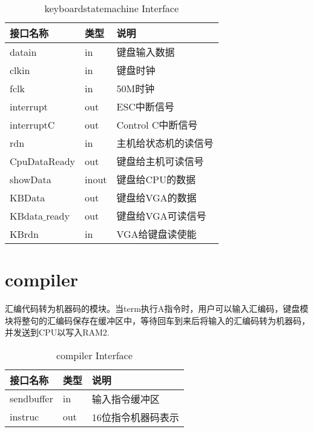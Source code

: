 \begin{table}[H]
\begin{center}
\renewcommand{\arraystretch}{1.3}
\small
\caption{keyboardstatemachine Interface}
\label{tab:treatments}
\begin{tabular}{|p{3cm}<{\centering}|p{1.4cm}<{\centering}|p{7cm}<{\centering}|}
\hline
接口名称 & 类型 & 说明 \\
\hline
datain & in & 键盘输入数据 \\
\hline
clkin & in & 键盘时钟 \\
\hline
fclk & in & 50M时钟 \\
\hline
interrupt & out & ESC中断信号 \\
\hline
interruptC & out & Control C中断信号 \\
\hline
rdn & in & 主机给状态机的读信号 \\
\hline
CpuDataReady & out & 键盘给主机可读信号 \\
\hline
showData & inout & 键盘给CPU的数据 \\
\hline
KBData & out & 键盘给VGA的数据\\
\hline
KBdata$\_$ready & out & 键盘给VGA可读信号\\
\hline
KBrdn & in & VGA给键盘读使能 \\
\hline
\end{tabular}
\end{center}
\end{table}


\section{compiler}

汇编代码转为机器码的模块。当term执行A指令时，用户可以输入汇编码，键盘模块将整句的汇编码保存在缓冲区中，等待回车到来后将输入的汇编码转为机器码，并发送到CPU以写入RAM2.

\begin{table}[H]
\begin{center}
\renewcommand{\arraystretch}{1.3}
\small
\caption{compiler Interface}
\label{tab:treatments}
\begin{tabular}{|p{3cm}<{\centering}|p{1.4cm}<{\centering}|p{7cm}<{\centering}|}
\hline
接口名称 & 类型 & 说明 \\
\hline
sendbuffer & in & 输入指令缓冲区 \\
\hline
instruc & out & 16位指令机器码表示 \\
\hline
\end{tabular}
\end{center}
\end{table}




